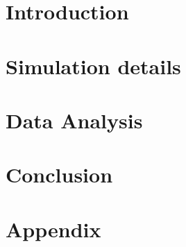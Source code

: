 \documentclass[a4paper, twoside, 11pt]{scrreprt}
\begin{document}



\renewcommand{\chapterpagestyle}{plain}

\tableofcontents 
\newpage

\listoffigures
\newpage

\listoftables
\newpage

\null\thispagestyle{empty}  %
\newpage


\pagestyle{scrheadings} %



\chapter{Introduction}

\newpage

\chapter{Simulation details}

\newpage

\chapter{Data Analysis}

\newpage

\chapter{Conclusion}

\newpage

\pagestyle{plain}
\renewcommand{\chapterpagestyle}{plain}
\chapter{Appendix}

\newpage

\printbibliography
\end{document}
